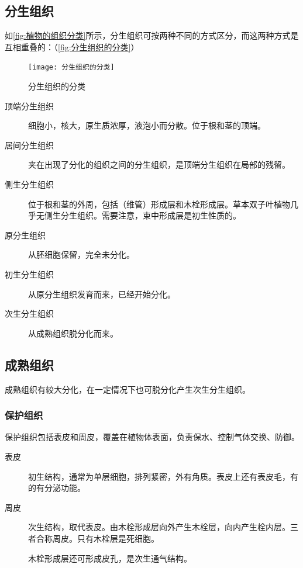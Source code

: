 \subsection{分生组织}

如\autoref{fig:植物的组织分类}所示，分生组织可按两种不同的方式区分，而这两种方式是互相重叠的：（\autoref{fig:分生组织的分类}）

\begin{figure}[htbp]
	\centering
	\texttt{[image: 分生组织的分类]}
	\caption{分生组织的分类}
	\label{fig:分生组织的分类}
\end{figure}

\begin{description}
	\item[顶端分生组织] 细胞小，核大，原生质浓厚，液泡小而分散。位于根和茎的顶端。
	\item[居间分生组织] 夹在出现了分化的组织之间的分生组织，是顶端分生组织在局部的残留。
	\item[侧生分生组织] 位于根和茎的外周，包括（维管）形成层和木栓形成层。草本双子叶植物几乎无侧生分生组织。需要注意，束中形成层是初生性质的。
	\item[原分生组织] 从胚细胞保留，完全未分化。
	\item[初生分生组织] 从原分生组织发育而来，已经开始分化。
	\item[次生分生组织] 从成熟组织脱分化而来。
\end{description}

\subsection{成熟组织}

成熟组织有较大分化，在一定情况下也可脱分化产生次生分生组织。

\subsubsection{保护组织}

保护组织包括表皮和周皮，覆盖在植物体表面，负责保水、控制气体交换、防御。

\begin{description}
	\item[表皮] 初生结构，通常为单层细胞，排列紧密，外有角质。表皮上还有表皮毛，有的有分泌功能。
	\item[周皮] 次生结构，取代表皮。由木栓形成层向外产生木栓层，向内产生栓内层。三者合称周皮。只有木栓层是死细胞。
	
	木栓形成层还可形成皮孔，是次生通气结构。
\end{description}


